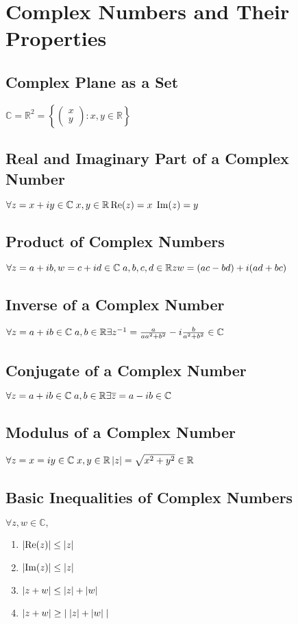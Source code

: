 \section{Complex Numbers and Their Properties}
\subsection*{Complex Plane as a Set}
$\mathbb{C} = \mathbb{R}^2 = \left\{\begin{pmatrix} x \\ y \end{pmatrix} : x, y \in \mathbb{R} \right\}$
\subsection*{Real and Imaginary Part of a Complex Number}
$\forall z = x + iy \in \mathbb{C} \; x, y \in \mathbb{R} \\ \re(z) = x \; \im(z) = y$
\subsection*{Product of Complex Numbers}
$\forall z = a + ib, w = c + id \in \mathbb{C} \; a, b, c, d \in \mathbb{R} \\
zw = (ac - bd) + i (ad + bc)$
\subsection*{Inverse of a Complex Number}
$\forall z = a + ib \in \mathbb{C} \; a, b \in \mathbb{R} \\
\exists z^{-1} = \frac{a}{aa^2 + b^2} - i \frac{b}{a^2 + b^2} \in \mathbb{C}$
\subsection*{Conjugate of a Complex Number}
$\forall z = a + ib \in \mathbb{C} \; a, b \in \mathbb{R} \\
\exists \bar{z} = a - ib \in \mathbb{C}$
\subsection*{Modulus of a Complex Number}
$\forall z = x = iy \in \mathbb{C} \; x, y \in \mathbb{R} \\
\abs{z} = \sqrt{x^2 + y^2} \in \mathbb{R}$
\subsection*{Basic Inequalities of Complex Numbers}
$\forall z, w \in \mathbb{C},$
\begin{enumerate}
	\item $\abs{\re(z)} \leq \abs{z}$
	\item $\abs{\im(z)} \leq \abs{z}$
	\item $\abs{z + w} \leq \abs{z} + \abs{w}$
	\item $\abs{z + w} \geq \abs{ \; \abs{z} + \abs{w} \; }$
\end{enumerate}
